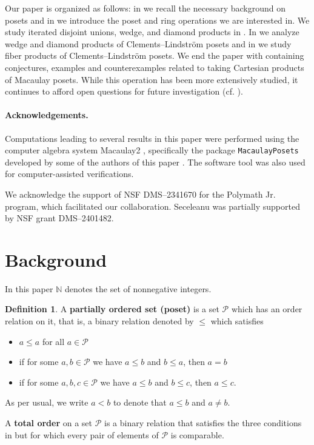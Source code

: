 \documentclass[11pt, reqno]{amsart}
\renewcommand{\P}{{\mathcal P}}
\theoremstyle{plain} %
\theoremstyle{definition}
\newtheorem{defn}[thm]{Definition}
\theoremstyle{remark}
\numberwithin{equation}{section}  %
\begin{document}
Our paper is organized as follows: in  we recall the necessary background on posets and in  we introduce the poset and ring operations we are interested in. We study iterated disjoint unions, wedge, and diamond products in . In  we analyze wedge and diamond products of Clements--Lindstr\"om posets and in  we study fiber products of Clements--Lindstr\"om posets. We end the paper with  containing conjectures, examples and counterexamples related to taking Cartesian products of Macaulay posets. While this operation has been more extensively studied, it continues to afford open questions for future investigation (cf. ).

\smallskip 

\paragraph{\bf Acknowledgements.} Computations leading to several results in this paper were
performed using the computer algebra system Macaulay2 \cite{M2}, specifically the package \texttt{MacaulayPosets} developed by some of the authors of this paper \cite{BKLS}. The software tool \cite{java} was also used for computer-assisted verifications. 

We acknowledge the support of NSF DMS--2341670
for the Polymath Jr.\,program, which facilitated our collaboration. 
Seceleanu was partially supported by NSF grant DMS--2401482.

\section{Background}\label{s:background}

In this paper $\mathbb{N}$ denotes the set of nonnegative integers.

\begin{defn}\label{def: partial order}
A {\bf partially ordered set (poset)} is a set $\P$ which has an order relation on it, that is, a binary relation denoted by $\leq$ which satisfies
\begin{itemize}
\item $a\leq a$ for all $a\in \P$
\item if for some $a,b\in \P$ we have $a\leq b$ and $b\leq a$, then $a=b$
\item if for some $a,b,c \in \P$ we have $a\leq b$ and $b\leq c$, then $a\leq c$.
\end{itemize}
As per usual, we write $a<b$ to denote that $a\leq b$ and $a\neq b$.

A {\bf total order}  on a set $\P$ is a binary relation that satisfies the three conditions in  but for which every pair of elements of $\P$ is comparable.
\end{defn}
\end{document}
